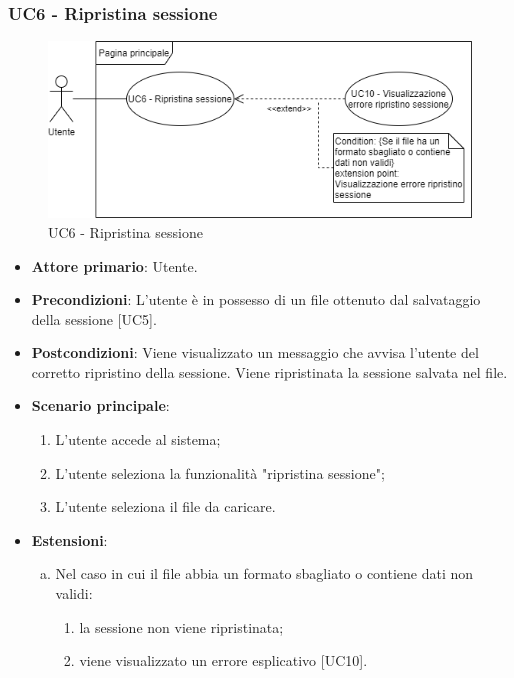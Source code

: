 \subsubsection{UC6 - Ripristina sessione}
\begin{figure}[h]
\includegraphics[width=\linewidth]{section/Images/UC6.png}
\centering
\caption{UC6 - Ripristina sessione}
\end{figure}
\begin{itemize}
	\item \textbf{Attore primario}: Utente.
	\item \textbf{Precondizioni}: L'utente è in possesso di un file ottenuto dal salvataggio della sessione [UC5].
	\item \textbf{Postcondizioni}: Viene visualizzato un messaggio che avvisa l'utente del corretto ripristino della sessione. Viene ripristinata la sessione salvata nel file.
	\item \textbf{Scenario principale}:
		\begin{enumerate}
			\item L'utente accede al sistema;
			\item L'utente seleziona la funzionalità "ripristina sessione";
			\item L'utente seleziona il file da caricare.
		\end{enumerate}
	\item \textbf{Estensioni}:
	\begin{enumerate}[(a)]
		\item Nel caso in cui il file abbia un formato sbagliato o contiene dati non validi:
		\begin{enumerate}[1.]
			\item la sessione non viene ripristinata;
			\item viene visualizzato un errore esplicativo [UC10].
		\end{enumerate}
	\end{enumerate}
\end{itemize}